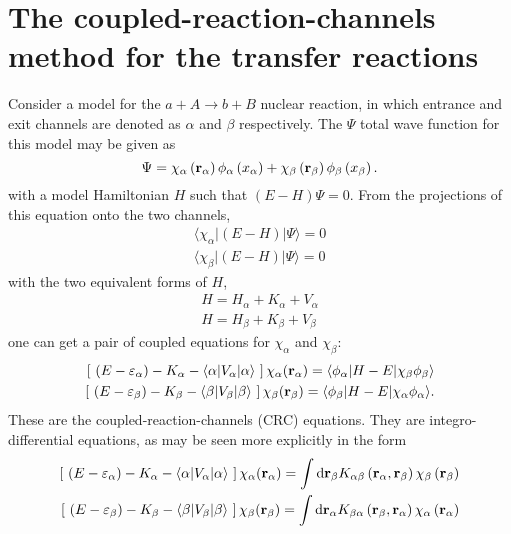 \documentclass[
11pt, %
english, %
onehalfspacing, %
headsepline, %
]{MastersDoctoralThesis} %
\begin{document}
\section{The coupled-reaction-channels method for the transfer reactions}
Consider a model for the $a+A\rightarrow b+B$ nuclear reaction, in which entrance and exit channels are denoted as $\alpha$ and $\beta$ respectively. The $\Psi$ total wave function for this model may be given as
\begin{equation}
\Psi = \chi_{\alpha} \left( {\bf r}_\alpha \right) \phi_\alpha \left( x_\alpha \right) + 
 \chi_{\beta} \left( {\bf r}_\beta \right) \phi_\beta \left( x_\beta \right).
\end{equation}
with a model Hamiltonian $H$ such that $\left( E-H \right) \Psi =0$. From the projections of this equation onto the two channels,
\begin{align}
\langle \chi_\alpha \vert \left( E-H \right) \vert \Psi \rangle = 0 \nonumber \\
\langle \chi_\beta \vert \left( E-H \right) \vert \Psi \rangle = 0
\end{align}
with the two equivalent forms of $H$,
\begin{align}
H= H_\alpha +K_\alpha + V_\alpha \nonumber \\
H= H_\beta +K_\beta + V_\beta
\end{align}
one can get a pair of coupled equations for $\chi_\alpha$ and $\chi_\beta$:
\begin{align}
\left[ ~\left(E-\varepsilon_\alpha \right)  -K_\alpha -
\langle \alpha \vert V_\alpha \vert \alpha \rangle ~\right] 
\chi_\alpha ({\bf r}_\alpha) = 
\langle \phi_\alpha \vert H-E \vert \chi_\beta \phi_\beta \rangle \nonumber \\
\left[ ~\left(E-\varepsilon_\beta \right)  -K_\beta -
\langle \beta \vert V_\beta \vert \beta \rangle ~\right] 
\chi_\beta ({\bf r}_\beta) = 
\langle \phi_\beta \vert H-E \vert \chi_\alpha \phi_\alpha \rangle.
\end{align}
These are the coupled-reaction-channels (CRC) equations. They are integro-differential equations, as may be seen more explicitly in the form
\begin{align}
\left[ ~\left(E-\varepsilon_\alpha \right)  -K_\alpha -
\langle \alpha \vert V_\alpha \vert \alpha \rangle ~\right] 
\chi_\alpha ({\bf r}_\alpha) = 
\int \text{d} {\bf r}_\beta K_{\alpha \beta} \left( {\bf r}_\alpha, {\bf r}_\beta \right) \chi_\beta \left(  {\bf r}_\beta \right)
 \nonumber \\
\left[ ~\left(E-\varepsilon_\beta \right)  -K_\beta -
\langle \beta \vert V_\beta \vert \beta \rangle ~\right] 
\chi_\beta ({\bf r}_\beta) = 
\int \text{d} {\bf r}_\alpha K_{\beta \alpha} \left( {\bf r}_\beta, {\bf r}_\alpha \right) \chi_\alpha \left(  {\bf r}_\alpha \right)
\end{align}
\end{document}
